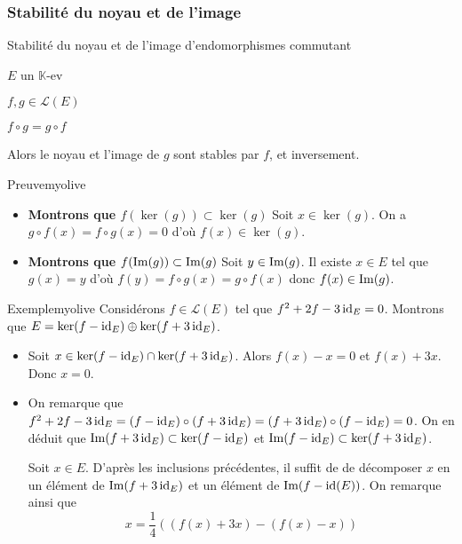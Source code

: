     \subsubsection{Stabilité du noyau et de l’image}

    \begin{prop}{Stabilité du noyau et de l’image d’endomorphismes commutant}{}
        \begin{soit}
            \item $E$ un $\mathbb{K}$-ev 
            \item $f,g \in \mathcal{L}(E)$
        \end{soit}
        \begin{suppose}
            \item $f \circ g = g \circ f$
        \end{suppose}
        Alors le noyau et l’image de $g$ sont stables par $f$, et inversement.
    \end{prop}

    \begin{demo}{Preuve}{myolive}
        \begin{itemize}
            \item \textbf{Montrons que $f(\ker(g)) \subset \ker(g)$} \quad Soit $x \in \ker(g)$. On a $g \circ f(x) = f \circ g(x) = 0$ d’où $f(x) \in \ker(g)$. 
            \item \textbf{Montrons que $f(\operatorname{Im}(g)) \subset \operatorname{Im}(g)$} \quad Soit $y \in \operatorname{Im}(g)$. Il existe $x \in E$ tel que $g(x) = y$ d’où $f(y) = f \circ g(x) = g \circ f(x)$ donc $f(x) \in \operatorname{Im}(g)$.
        \end{itemize}
    \end{demo}

    \begin{omed}{Exemple}{myolive}
        Considérons $f \in \mathcal{L}(E)$ tel que $f^2 + 2 f - 3 \operatorname{id}_E = 0$. Montrons que $E = \ker(f - \operatorname{id}_E) \oplus \ker(f + 3 \operatorname{id}_E)$.
        \begin{itemize}
            \item Soit $x \in \ker(f - \operatorname{id}_E) \cap \ker(f + 3 \operatorname{id}_E)$. Alors $f(x) - x = 0$ et $f(x) + 3x$. Donc $x = 0$.
            \item On remarque que $f^2 + 2f - 3 \operatorname{id}_E = (f - \operatorname{id}_E) \circ (f + 3 \operatorname{id}_E) = (f + 3 \operatorname{id}_E) \circ (f - \operatorname{id}_E) = 0$. On en déduit que $\operatorname{Im}(f + 3 \operatorname{id}_E) \subset \ker(f - \operatorname{id}_E)$ et $\operatorname{Im}(f - \operatorname{id}_E) \subset \ker(f + 3 \operatorname{id}_E)$.
            
            Soit $x \in E$. D’après les inclusions précédentes, il suffit de de décomposer $x$ en un élément de $\operatorname{Im}(f + 3 \operatorname{id}_E)$ et un élément de $\operatorname{Im}(f - \operatorname{id}(E))$. On remarque ainsi que 
            \[ x = \frac{1}{4} \left( \left(f(x) + 3x\right) - \left(f(x) - x\right) \right) \]
        \end{itemize}
    \end{omed}

